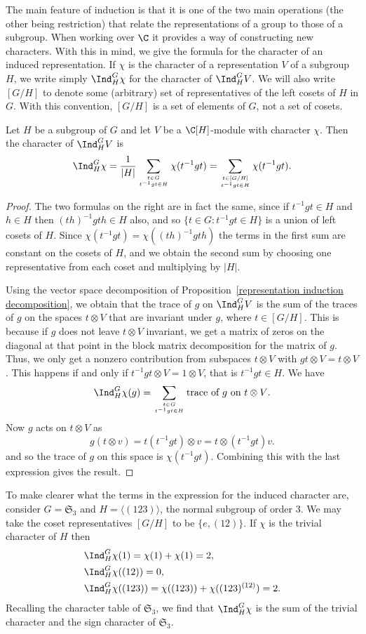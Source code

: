 The main feature of induction is that it is one of the two main operations (the other being restriction) that relate the representations of a group to those of a subgroup. When working over $\C$ it provides a way of constructing new characters. With this in mind, we give the formula for the character of an induced representation. If $\chi$ is the character of a representation $V$ of a subgroup $H$, we write simply $\Ind^G_H\chi$ for the character of $\Ind^G_HV$. We will also write $[G/H]$ to denote some (arbitrary) set of representatives of the left cosets of $H$ in $G$. With this convention, $[G/H]$ is a set of elements of $G$, not a set of cosets.
\begin{proposition}\label{representation induction character}
Let $H$ be a subgroup of $G$ and let $V$ be a $\C[H]$-module with character $\chi$. Then the character of $\Ind^G_HV$ is
\[\Ind^G_H\chi=\frac{1}{|H|}\sum_{t\in G\atop t^{-1}gt\in H}\chi(t^{-1}gt)=\sum_{t\in[G/H]\atop t^{-1}gt\in H}\chi(t^{-1}gt).\]
\end{proposition}
\begin{proof}
The two formulas on the right are in fact the same, since if $t^{-1}gt\in H$ and $h\in H$ then $(th)^{-1}gth\in H$ also, and so $\{t\in G:t^{-1}gt\in H\}$ is a union of left cosets of $H$. Since $\chi(t^{-1}gt)=\chi((th)^{-1}gth)$ the terms in the first sum are constant on the cosets of $H$, and we obtain the second sum by choosing one representative from each coset and multiplying by $|H|$.\par
Using the vector space decomposition of Proposition~\ref{representation induction decomposition}, we obtain that the trace of $g$ on $\Ind^G_HV$ is the sum of the traces of $g$ on the spaces $t\otimes V$ that are invariant under $g$, where $t\in[G/H]$. This is because if $g$ does not leave $t\otimes V$ invariant, we get a matrix of zeros on the diagonal at that point in the block matrix decomposition for the matrix of $g$. Thus, we only get a nonzero contribution from subspaces $t\otimes V$ with $gt\otimes V=t\otimes V$. This happens if and only if $t^{-1}gt\otimes V=1\otimes V$, that is $t^{-1}gt\in H$. We have
\[\Ind^G_H\chi(g)=\sum_{t\in G\atop t^{-1}gt\in H}\text{trace of $g$ on $t\otimes V$}.\]
Now $g$ acts on $t\otimes V$ as
\[g(t\otimes v)=t(t^{-1}gt)\otimes v=t\otimes(t^{-1}gt)v.\]
and so the trace of $g$ on this space is $\chi(t^{-1}gt)$. Combining this with the last expression gives the result.
\end{proof}
\begin{example}
To make clearer what the terms in the expression for the induced character are, consider $G=\mathfrak{S}_3$ and $H=\langle(123)\rangle$, the normal subgroup of order $3$. We may take the coset representatives $[G/H]$ to be $\{e,(12)\}$. If $\chi$ is the trivial character of $H$ then
\begin{align*}
&\Ind^G_H\chi(1)=\chi(1)+\chi(1)=2,\\
&\Ind^G_H\chi((12))=0,\\
&\Ind^G_H\chi((123))=\chi((123))+\chi((123)^{(12)})=2.
\end{align*}
Recalling the character table of $\mathfrak{S}_3$, we find that $\Ind^G_H\chi$ is the sum of the trivial character and the sign character of $\mathfrak{S}_3$.
\end{example}
